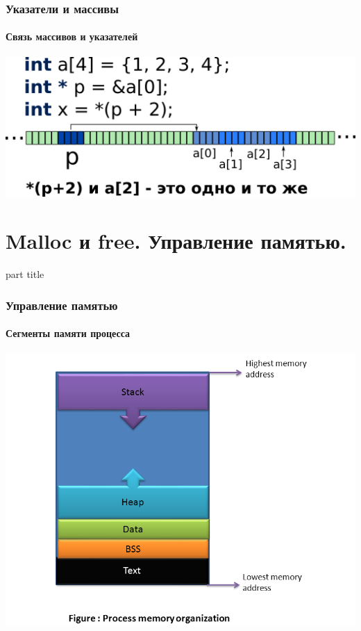 \documentclass[14pt,pdf,hyperref={unicode}]{beamer}
\begin{document}
\begin{frame}[fragile]
\frametitle{Указатели и массивы} 
\framesubtitle{Связь массивов и указателей}
\begin{center}
\includegraphics[width=0.95\linewidth]{images/memory_parrays_4.png}
\end{center}
\end{frame}






\section{Malloc и free. Управление памятью.}
\begin{frame}
\begin{center}
\begin{beamercolorbox}[sep=8pt,center]{part
title}
\insertsection
\end{beamercolorbox}
\end{center}
\end{frame}

\begin{frame}[fragile]
\frametitle{Управление памятью} 
\framesubtitle{Сегменты памяти процесса}
\begin{center}
\includegraphics[width=0.8\linewidth]{images/process_memory_organization.png}
\end{center}
\end{frame}
\end{document}
